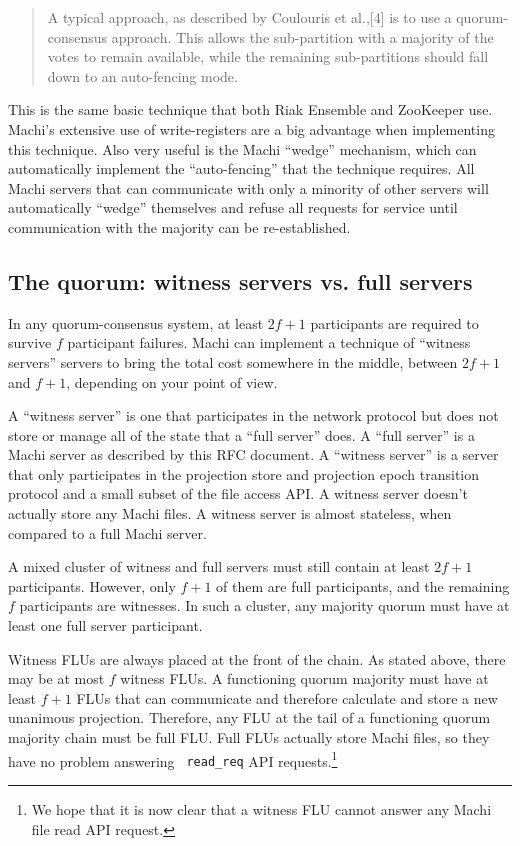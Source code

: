 \documentclass[preprint,10pt]{sigplanconf}
\begin{document}
\begin{quotation}
A typical approach, as described by Coulouris et al.,[4] is to use a
quorum-consensus approach. This allows the sub-partition with a
majority of the votes to remain available, while the remaining
sub-partitions should fall down to an auto-fencing mode.
\end{quotation}

This is the same basic technique that
both Riak Ensemble and ZooKeeper use.  Machi's
extensive use of write-registers are a big advantage when implementing
this technique.  Also very useful is the Machi ``wedge'' mechanism,
which can automatically implement the ``auto-fencing'' that the
technique requires.  All Machi servers that can communicate with only
a minority of other servers will automatically ``wedge'' themselves
and refuse all requests for service until communication with the
majority can be re-established.

\subsection{The quorum: witness servers vs. full servers}

In any quorum-consensus system, at least $2f+1$ participants are
required to survive $f$ participant failures.  Machi can implement a
technique of ``witness servers'' servers to bring the total cost
somewhere in the middle, between $2f+1$ and $f+1$, depending on your
point of view.

A ``witness server'' is one that participates in the network protocol
but does not store or manage all of the state that a ``full server''
does.  A ``full server'' is a Machi server as
described by this RFC document.  A ``witness server'' is a server that
only participates in the projection store and projection epoch
transition protocol and a small subset of the file access API.
A witness server doesn't actually store any
Machi files.  A witness server is almost stateless, when compared to a
full Machi server.

A mixed cluster of witness and full servers must still contain at
least $2f+1$ participants.  However, only $f+1$ of them are full
participants, and the remaining $f$ participants are witnesses.  In
such a cluster, any majority quorum must have at least one full server
participant.

Witness FLUs are always placed at the front of the chain.  As stated
above, there may be at most $f$ witness FLUs.  A functioning quorum
majority
must have at least $f+1$ FLUs that can communicate and therefore
calculate and store a new unanimous projection.  Therefore, any FLU at
the tail of a functioning quorum majority chain must be full FLU.  Full FLUs
actually store Machi files, so they have no problem answering {\tt
  read\_req} API requests.\footnote{We hope that it is now clear that
  a witness FLU cannot answer any Machi file read API request.}
\end{document}
